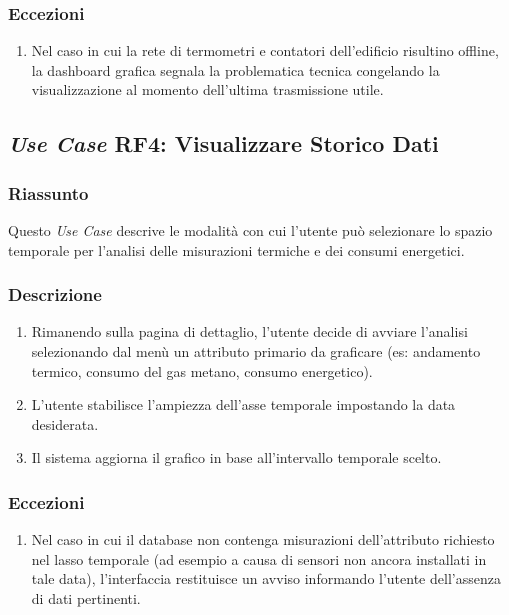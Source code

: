         \subsubsection*{Eccezioni}
            \begin{enumerate}
                \item Nel caso in cui la rete di termometri e contatori dell'edificio risultino offline, la dashboard grafica segnala la problematica tecnica congelando la visualizzazione al momento dell'ultima trasmissione utile.
            \end{enumerate}

    \subsection*{\textit{Use Case} RF4: Visualizzare Storico Dati}
        \subsubsection*{Riassunto}
            Questo \textit{Use Case} descrive le modalità con cui l'utente può selezionare lo spazio temporale per l'analisi delle misurazioni termiche e dei consumi energetici.
        \subsubsection*{Descrizione}
            \begin{enumerate}
                \item Rimanendo sulla pagina di dettaglio, l'utente decide di avviare l'analisi selezionando dal menù un attributo primario da graficare (es: andamento termico, consumo del gas metano, consumo energetico).
                \item L'utente stabilisce l'ampiezza dell'asse temporale impostando la data desiderata.
                \item Il sistema aggiorna il grafico in base all'intervallo temporale scelto.
            \end{enumerate}
        \subsubsection*{Eccezioni}
            \begin{enumerate}
                \item Nel caso in cui il database non contenga misurazioni dell'attributo richiesto nel lasso temporale (ad esempio a causa di sensori non ancora installati in tale data), l'interfaccia restituisce un avviso informando l'utente dell'assenza di dati pertinenti.
            \end{enumerate}

